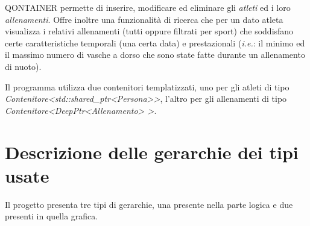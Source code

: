 \documentclass[10pt, a4paper]{article}
\begin{document}
QONTAINER permette di inserire, modificare ed eliminare gli \emph{atleti} ed i loro \emph{allenamenti}.
Offre inoltre una funzionalità di ricerca che per un dato atleta visualizza i relativi allenamenti (tutti
oppure filtrati per sport) che soddisfano certe caratteristiche temporali (una certa data)
e prestazionali (\emph{i.e.}: il minimo ed il massimo numero di vasche a dorso che sono state fatte
durante un allenamento di nuoto).

Il programma utilizza due contenitori templatizzati, uno per gli atleti di tipo
\emph{Contenitore<std::shared\_ptr<Persona>>}, l'altro per gli allenamenti di tipo \emph{Contenitore<DeepPtr<Allenamento> >}.

\section{Descrizione delle gerarchie dei tipi usate}
Il progetto presenta tre tipi di gerarchie, una presente nella parte logica e due presenti in quella grafica.
\end{document}
